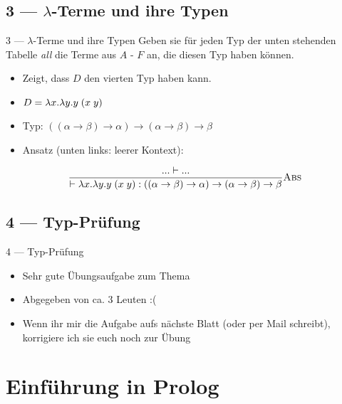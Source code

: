 \documentclass{beamer}
\begin{document}
\subsection{3 --- $\lambda$-Terme und ihre Typen}

\begin{frame}{3 --- $\lambda$-Terme und ihre Typen}
	Geben sie für jeden Typ der unten stehenden Tabelle \emph{all} die Terme aus $A$ - $F$ an, die diesen Typ haben können.

	\begin{itemize}
		\item Zeigt, dass $D$ den vierten Typ haben kann.
		\item $D = \abs{x}{\abs{y}{\liin{y}{\lii{x}{y}}}}$
		\item Typ: $((\alpha \to \beta) \to \alpha) \to (\alpha \to \beta) \to \beta$
		\pause
		\item Ansatz (unten links: leerer Kontext):
	\end{itemize}

	\begin{equation*}
		\typeRule{Abs}{
			... \vdash ...
		}{
			\vdash \abs{x}{\abs{y}{\liin{y}{\lii{x}{y}}}} : ((\alpha \to \beta) \to \alpha) \to (\alpha \to \beta) \to \beta
		}
	\end{equation*}
\end{frame}

\subsection{4 --- Typ-Prüfung}

\begin{frame}{4 --- Typ-Prüfung}
	\begin{itemize}
		\item Sehr gute Übungsaufgabe zum Thema
		\item Abgegeben von ca. 3 Leuten :(
		\item Wenn ihr mir die Aufgabe aufs nächste Blatt (oder per Mail schreibt), korrigiere ich sie euch noch zur Übung
	\end{itemize}
\end{frame}

\section{Einführung in Prolog}
\end{document}
